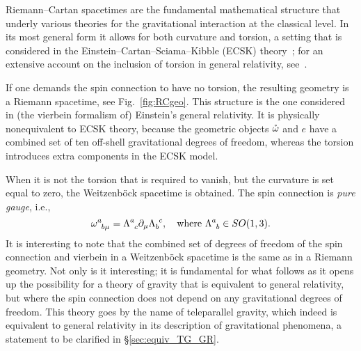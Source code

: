 \documentclass[
final,
11pt,
a4paper,
DIV=11,
headinclude=true,
footinclude=false,
bibliography=totoc,
twoside=true,  %
BCOR=5mm
]{scrbook}
\begin{document}
Riemann--Cartan spacetimes are the fundamental mathematical 
structure that underly various theories for the gravitational 
interaction at the classical level. In its most general form it 
allows for both curvature and torsion, a setting that is 
considered in the Einstein--Cartan--Sciama--Kibble (ECSK) 
theory~\cite{Cartan:1924yea, Cartan:1923zea, Kibble:1961ba, 
  Sciama:1964wt}; for an extensive account on the inclusion of 
torsion in general relativity, see~\cite{Hehl:1976grs}.

If one demands the spin connection to have no torsion, the 
resulting geometry is a Riemann spacetime, see 
Fig.~\ref{fig:RCgeo}. This structure is the one considered in 
(the vierbein formalism of) Einstein's general relativity. It is 
physically nonequivalent to ECSK theory, because the geometric 
objects $\mathring{\omega}$ and $e$ have a combined set of ten 
off-shell gravitational degrees of freedom, whereas the torsion 
introduces extra components in the ECSK model.

When it is not the torsion that is required to vanish, but the 
curvature is set equal to zero, the Weitzenb\"ock spacetime is 
obtained. The spin connection is \emph{pure gauge}, i.e.,
\begin{equation}
  \omega\ind{^a_{b\mu}} = \Lambda\ind{^a_c}\pd_\mu 
  \Lambda\ind{_b^c},
  \quad\text{where~}
  \Lambda\ind{^a_b} \in SO(1,3).
\end{equation}
It is interesting to note that the combined set of degrees of 
freedom of the spin connection and vierbein in a Weitzenb\"ock 
spacetime is the same as in a Riemann geometry. Not only is it 
interesting; it is fundamental for what follows as it opens up 
the possibility for a theory of gravity that is equivalent to 
general relativity, but where the spin connection does not depend 
on any gravitational degrees of freedom. This theory goes by the 
name of teleparallel gravity, which indeed is equivalent to 
general relativity in its description of gravitational phenomena, 
a statement to be clarified in \S\ref{sec:equiv_TG_GR}.
\end{document}
